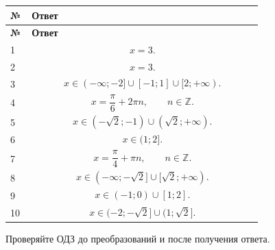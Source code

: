 \documentclass[a4paper,12pt]{article}
\newcommand{\Z}{\mathbb{Z}}
\begin{document}
\begin{longtable}{@{}p{0.08\linewidth}p{0.86\linewidth}@{}}
\toprule
\textbf{\textcolor{darkaccent}{№}} &
\textbf{\textcolor{darkaccent}{Ответ}}\\
\midrule
\endfirsthead

\toprule
\textbf{\textcolor{darkaccent}{№}} &
\textbf{\textcolor{darkaccent}{Ответ}}\\
\midrule
\endhead

1 &
\[
x=3.
\]
\\

2 &
\[
x=3.
\]
\\

3 &
\[
x\in(-\infty;-2]\cup[-1;1]\cup[2;+\infty).
\]
\\

4 &
\[
x=\frac{\pi}{6}+2\pi n,\qquad n\in\Z.
\]
\\

5 &
\[
x\in(-\sqrt2;-1)\cup(\sqrt2;+\infty).
\]
\\

6 &
\[
x\in(1;2].
\]
\\

7 &
\[
x=\frac{\pi}{4}+\pi n,\qquad n\in\Z.
\]
\\

8 &
\[
x\in(-\infty;-\sqrt2]\cup[\sqrt2;+\infty).
\]
\\

9 &
\[
x\in(-1;0)\cup[1;2].
\]
\\

10 &
\[
x\in(-2;-\sqrt2]\cup(1;\sqrt2].
\]
\\

\bottomrule
\end{longtable}

\vfill

\begin{center}
\textcolor{softgray}{%
Проверяйте ОДЗ до преобразований и после получения ответа.}
\end{center}
\end{document}
